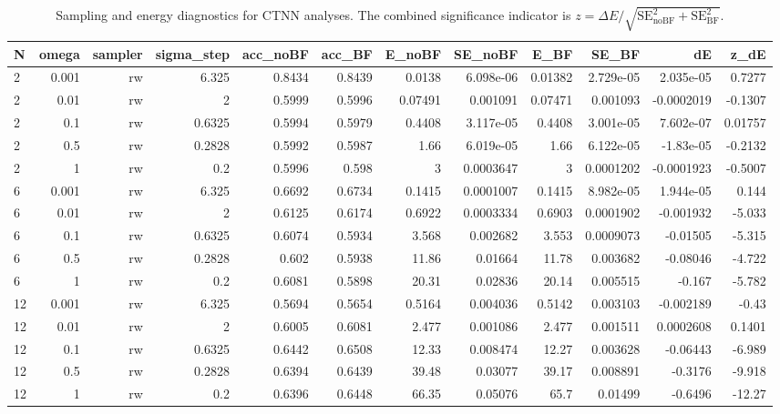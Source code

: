 \begin{table}
\caption{Sampling and energy diagnostics for CTNN analyses. The combined significance indicator is $z=\Delta E/\sqrt{\mathrm{SE}_{\mathrm{noBF}}^2+\mathrm{SE}_{\mathrm{BF}}^2}$.}
\label{tab:ctnn_system_energy_mcmc}
\begin{tabular}{lrrrrrrrrrrr}
\toprule
N & omega & sampler & sigma\_step & acc\_noBF & acc\_BF & E\_noBF & SE\_noBF & E\_BF & SE\_BF & dE & z\_dE \\
\midrule
2 & 0.001 & rw & 6.325 & 0.8434 & 0.8439 & 0.0138 & 6.098e-06 & 0.01382 & 2.729e-05 & 2.035e-05 & 0.7277 \\
2 & 0.01 & rw & 2 & 0.5999 & 0.5996 & 0.07491 & 0.001091 & 0.07471 & 0.001093 & -0.0002019 & -0.1307 \\
2 & 0.1 & rw & 0.6325 & 0.5994 & 0.5979 & 0.4408 & 3.117e-05 & 0.4408 & 3.001e-05 & 7.602e-07 & 0.01757 \\
2 & 0.5 & rw & 0.2828 & 0.5992 & 0.5987 & 1.66 & 6.019e-05 & 1.66 & 6.122e-05 & -1.83e-05 & -0.2132 \\
2 & 1 & rw & 0.2 & 0.5996 & 0.598 & 3 & 0.0003647 & 3 & 0.0001202 & -0.0001923 & -0.5007 \\
6 & 0.001 & rw & 6.325 & 0.6692 & 0.6734 & 0.1415 & 0.0001007 & 0.1415 & 8.982e-05 & 1.944e-05 & 0.144 \\
6 & 0.01 & rw & 2 & 0.6125 & 0.6174 & 0.6922 & 0.0003334 & 0.6903 & 0.0001902 & -0.001932 & -5.033 \\
6 & 0.1 & rw & 0.6325 & 0.6074 & 0.5934 & 3.568 & 0.002682 & 3.553 & 0.0009073 & -0.01505 & -5.315 \\
6 & 0.5 & rw & 0.2828 & 0.602 & 0.5938 & 11.86 & 0.01664 & 11.78 & 0.003682 & -0.08046 & -4.722 \\
6 & 1 & rw & 0.2 & 0.6081 & 0.5898 & 20.31 & 0.02836 & 20.14 & 0.005515 & -0.167 & -5.782 \\
12 & 0.001 & rw & 6.325 & 0.5694 & 0.5654 & 0.5164 & 0.004036 & 0.5142 & 0.003103 & -0.002189 & -0.43 \\
12 & 0.01 & rw & 2 & 0.6005 & 0.6081 & 2.477 & 0.001086 & 2.477 & 0.001511 & 0.0002608 & 0.1401 \\
12 & 0.1 & rw & 0.6325 & 0.6442 & 0.6508 & 12.33 & 0.008474 & 12.27 & 0.003628 & -0.06443 & -6.989 \\
12 & 0.5 & rw & 0.2828 & 0.6394 & 0.6439 & 39.48 & 0.03077 & 39.17 & 0.008891 & -0.3176 & -9.918 \\
12 & 1 & rw & 0.2 & 0.6396 & 0.6448 & 66.35 & 0.05076 & 65.7 & 0.01499 & -0.6496 & -12.27 \\

\end{tabular}
\end{table}

